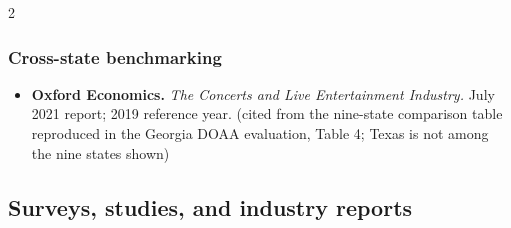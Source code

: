 {\begin{multicols}{2}
\subsubsection*{Cross-state benchmarking}
\begin{itemize}[itemsep=0pt,topsep=1pt,parsep=0pt,partopsep=0pt,leftmargin=1em]
\item \textbf{Oxford Economics.} \textit{The Concerts and Live Entertainment Industry.} July 2021 report; 2019 reference year. {\color{ammuted}(cited from the nine-state comparison table reproduced in the Georgia DOAA evaluation, Table 4; Texas is not among the nine states shown)}
\end{itemize}
\end{multicols}
}

\subsection*{Surveys, studies, and industry reports}

